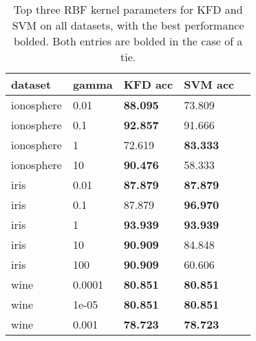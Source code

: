 \documentclass[12pt]{article}
\begin{document}
\begin{table}[ht]
\begin{tabular}{l || p{2cm} | p{2cm} | p{2cm} |  p{2cm}}
dataset & gamma & KFD acc & SVM acc\\
\hline
\hline
ionosphere & 0.01 & \textbf{88.095} & 73.809 \\ 
ionosphere & 0.1 & \textbf{92.857} & 91.666\\ 
ionosphere & 1 & 72.619& \textbf{83.333} \\ 
ionosphere & 10 & \textbf{90.476} & 58.333 \\ 
\hline
iris  & 0.01 & \textbf{87.879} & \textbf{87.879} \\ 
iris  & 0.1 & 87.879 & \textbf{96.970} \\ 
iris & 1 & \textbf{93.939} & \textbf{93.939} \\ 
iris & 10 & \textbf{90.909} & 84.848 \\ 
iris & 100 &  \textbf{90.909} & 60.606 \\ 
\hline
wine & 0.0001 & \textbf{80.851} & \textbf{80.851} \\ 
wine & 1e-05 & \textbf{80.851} & \textbf{80.851} \\ 
wine & 0.001 & \textbf{78.723} & \textbf{78.723} \\ 
\end{tabular}
\caption{Top three RBF kernel parameters for KFD and SVM on all datasets, with the best performance bolded.  Both entries are bolded in the case of a tie.}
\label{tab-rbf1}
\end{table}
\end{document}
